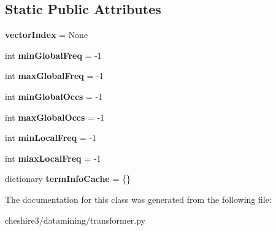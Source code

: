 \subsection*{Static Public Attributes}
\begin{DoxyCompactItemize}
\item 
\hypertarget{classcheshire3_1_1datamining_1_1transformer_1_1_split_arm_vector_transformer_a08f92a017847575f2462709dcad1a600}{{\bfseries vector\-Index} = None}\label{classcheshire3_1_1datamining_1_1transformer_1_1_split_arm_vector_transformer_a08f92a017847575f2462709dcad1a600}

\item 
\hypertarget{classcheshire3_1_1datamining_1_1transformer_1_1_split_arm_vector_transformer_ad84832dc1ab8978852acdc71dd4dba20}{int {\bfseries min\-Global\-Freq} = -\/1}\label{classcheshire3_1_1datamining_1_1transformer_1_1_split_arm_vector_transformer_ad84832dc1ab8978852acdc71dd4dba20}

\item 
\hypertarget{classcheshire3_1_1datamining_1_1transformer_1_1_split_arm_vector_transformer_ab2e9a58b6017fd18f05671b11fb50297}{int {\bfseries max\-Global\-Freq} = -\/1}\label{classcheshire3_1_1datamining_1_1transformer_1_1_split_arm_vector_transformer_ab2e9a58b6017fd18f05671b11fb50297}

\item 
\hypertarget{classcheshire3_1_1datamining_1_1transformer_1_1_split_arm_vector_transformer_ad30dfc9112db0c376bca3c077f15a6a5}{int {\bfseries min\-Global\-Occs} = -\/1}\label{classcheshire3_1_1datamining_1_1transformer_1_1_split_arm_vector_transformer_ad30dfc9112db0c376bca3c077f15a6a5}

\item 
\hypertarget{classcheshire3_1_1datamining_1_1transformer_1_1_split_arm_vector_transformer_a964748b00eeac3c4dbabe23870815006}{int {\bfseries max\-Global\-Occs} = -\/1}\label{classcheshire3_1_1datamining_1_1transformer_1_1_split_arm_vector_transformer_a964748b00eeac3c4dbabe23870815006}

\item 
\hypertarget{classcheshire3_1_1datamining_1_1transformer_1_1_split_arm_vector_transformer_a842446dfc1cc77af5d7f56d5d1db8d06}{int {\bfseries min\-Local\-Freq} = -\/1}\label{classcheshire3_1_1datamining_1_1transformer_1_1_split_arm_vector_transformer_a842446dfc1cc77af5d7f56d5d1db8d06}

\item 
\hypertarget{classcheshire3_1_1datamining_1_1transformer_1_1_split_arm_vector_transformer_a3bef45798f812b35931e03e4e473ed64}{int {\bfseries miax\-Local\-Freq} = -\/1}\label{classcheshire3_1_1datamining_1_1transformer_1_1_split_arm_vector_transformer_a3bef45798f812b35931e03e4e473ed64}

\item 
\hypertarget{classcheshire3_1_1datamining_1_1transformer_1_1_split_arm_vector_transformer_aae6788af58c678ca6c1314e8bd802f38}{dictionary {\bfseries term\-Info\-Cache} = \{\}}\label{classcheshire3_1_1datamining_1_1transformer_1_1_split_arm_vector_transformer_aae6788af58c678ca6c1314e8bd802f38}

\end{DoxyCompactItemize}


The documentation for this class was generated from the following file\-:\begin{DoxyCompactItemize}
\item 
cheshire3/datamining/transformer.\-py\end{DoxyCompactItemize}
